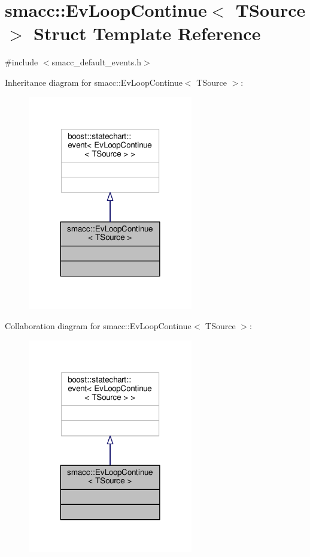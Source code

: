 \hypertarget{structsmacc_1_1EvLoopContinue}{}\section{smacc\+:\+:Ev\+Loop\+Continue$<$ T\+Source $>$ Struct Template Reference}
\label{structsmacc_1_1EvLoopContinue}


{\ttfamily \#include $<$smacc\+\_\+default\+\_\+events.\+h$>$}



Inheritance diagram for smacc\+:\+:Ev\+Loop\+Continue$<$ T\+Source $>$\+:
\nopagebreak
\begin{figure}[H]
\begin{center}
\leavevmode
\includegraphics[width=204pt]{structsmacc_1_1EvLoopContinue__inherit__graph}
\end{center}
\end{figure}


Collaboration diagram for smacc\+:\+:Ev\+Loop\+Continue$<$ T\+Source $>$\+:
\nopagebreak
\begin{figure}[H]
\begin{center}
\leavevmode
\includegraphics[width=204pt]{structsmacc_1_1EvLoopContinue__coll__graph}
\end{center}
\end{figure}


